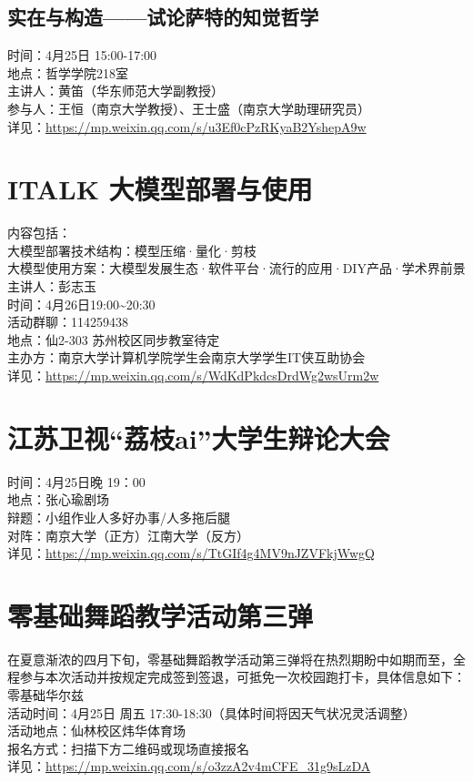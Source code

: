 \documentclass[letterpaper, 12pt]{article}
\begin{document}
\begin{multicols}{2}
\subsection{实在与构造——试论萨特的知觉哲学} %
时间：4月25日 15:00-17:00
\\地点：哲学学院218室
\\主讲人：黄笛（华东师范大学副教授）
\\参与人：王恒（南京大学教授）、王士盛（南京大学助理研究员）
\\详见：\url{https://mp.weixin.qq.com/s/u3Ef0cPzRKyaB2YshepA9w}

\section{ITALK 大模型部署与使用} %
内容包括：
\\大模型部署技术结构：模型压缩·量化·剪枝
\\大模型使用方案：大模型发展生态·软件平台·流行的应用·DIY产品·学术界前景
\\主讲人：彭志玉
\\时间：4月26日19:00\textasciitilde{}20:30
\\活动群聊：114259438
\\地点：仙2-303 苏州校区同步教室待定
\\主办方：南京大学计算机学院学生会南京大学学生IT侠互助协会
\\详见：\url{https://mp.weixin.qq.com/s/WdKdPkdcsDrdWg2wsUrm2w}

\section{江苏卫视“荔枝ai”大学生辩论大会} %
时间：4月25日晚 19：00
\\地点：张心瑜剧场
\\辩题：小组作业人多好办事/人多拖后腿
\\对阵：南京大学（正方）江南大学（反方）
\\详见：\url{https://mp.weixin.qq.com/s/TtGIf4g4MV9nJZVFkjWwgQ}

\section{零基础舞蹈教学活动第三弹} %
在夏意渐浓的四月下旬，零基础舞蹈教学活动第三弹将在热烈期盼中如期而至，全程参与本次活动并按规定完成签到签退，可抵免一次校园跑打卡，具体信息如下：零基础华尔兹
\\活动时间：4月25日 周五 17:30-18:30（具体时间将因天气状况灵活调整）
\\活动地点：仙林校区炜华体育场
\\报名方式：扫描下方二维码或现场直接报名
\\详见：\url{https://mp.weixin.qq.com/s/o3zzA2v4mCFE_31g9sLzDA}


\end{multicols}
\end{document}
